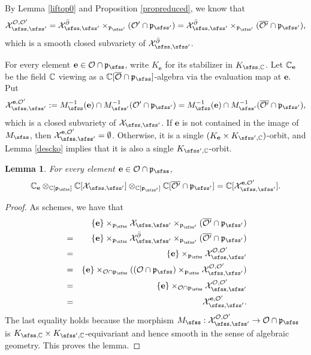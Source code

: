 \documentclass[11pt,a4paper]{amsart}
\newcommand{\CO}{{\mathcal {O}}}
\newcommand{\CX}{{\mathcal {X}}}
\newcommand{\p}{\mathfrak p}
\newcommand{\be}{\begin {equation}}
\newcommand{\ee}{\end {equation}}
\numberwithin{equation}{section}
\newtheorem{lem}[thm]{Lemma}
\theoremstyle{remark}
\begin{document}
By Lemma \ref{liftop0} and Proposition \ref{propreduced}, we know that
\be\label{cxee}
 \CX_{\sfss, \sfss'}^{\CO, \CO'}=\CX_{\sfss, \sfss'}^{\bar \partial}\times_{\p_{\sfss'}} ({\CO'}\cap \p_{\sfss'})=\CX_{\sfss, \sfss'}^{\bar \partial}\times_{\p_{\sfss'}} ({\overline{\CO'}}\cap \p_{\sfss'}),
 \ee
 which  is a smooth closed subvariety of $\CX_{\sfss, \sfss'}^{\bar \partial}$.


For every element $\mathbf e\in \CO\cap \p_\sfss$, write $K_\mathbf e$ for its  stabilizer in $K_{\sfss, \C}$. Let $\mathbb{C}_\mathbf e$ be the field $\mathbb{C}$ viewing as a  $\C[\overline \CO\cap \p_\sfss]$-algebra via the evaluation map at $\mathbf e$. Put
\[
  \CX_{\sfss, \sfss'}^{\mathbf e, \CO'}:=M_\sfss^{-1}(\mathbf e)\cap M_{\sfss'}^{-1}(\CO'\cap\p_{\sfss'})=M_\sfss^{-1}(\mathbf e)\cap M_{\sfss'}^{-1}(\overline{\CO'}\cap\p_{\sfss'}),
\]
which is a closed subvariety of $\CX_{\sfss, \sfss'}$. If $\mathbf e$ is not contained in the image of $M_\sfss$, then $\CX_{\sfss, \sfss'}^{\mathbf e, \CO'}=\emptyset$. Otherwise, it is a single
$(K_\mathbf e\times K_{\sfss',\C})$-orbit, and Lemma \ref{descko} implies that it is also a single $K_{\sfss',\C}$-orbit.
\begin{lem}\label{fiber111}
For every element $\mathbf e\in \CO\cap \p_\sfss$,
\[
  \C_\mathbf e \otimes_{\C[\p_{\sfss}]} \C[\CX_{\sfss, \sfss'}]\otimes_{\C[\p_{\sfss'}]} \C[\overline{\CO'}\cap \p_{\sfss'}]=\C[\CX_{\sfss, \sfss'}^{\mathbf e, \CO'}].
\]
\end{lem}
\begin{proof}
As schemes, we have that
\begin{eqnarray*}
  &&\{\mathbf e\}\times_{\p_\sfss}{\CX_{\sfss, \sfss'}}\times_{\p_{\sfss'}} (\overline{\CO'}\cap \p_{\sfss'})\\
  &=& \{\mathbf e\}\times_{\p_\sfss}{\CX^{\bar \partial}_{\sfss, \sfss'}}\times_{\p_{\sfss'}} (\overline{\CO'}\cap \p_{\sfss'})\\
    &=& \{\mathbf e\}\times_{\p_\sfss}   \CX_{\sfss, \sfss'}^{\CO, \CO'}\\
    &=& \{\mathbf e\} \times_{\CO\cap \p_\sfss} ( (\CO\cap \p_\sfss) \times_{\p_\sfss} \CX_{\sfss, \sfss'}^{\CO, \CO'})\\
     &=& \{\mathbf e\} \times_{\CO\cap \p_\sfss} \CX_{\sfss, \sfss'}^{\CO, \CO'}\\
   &=& \CX_{\sfss, \sfss'}^{\mathbf e, \CO'}.
\end{eqnarray*}
The last equality holds because the morphism $M_\sfss: \CX_{\sfss, \sfss'}^{\CO, \CO'}\rightarrow \CO\cap \p_\sfss$  is  $K_{\sfss, \C}\times K_{\sfss',\C}$-equivariant and hence smooth in the sense of algebraic geometry. This proves the lemma.
\end{proof}
\end{document}
